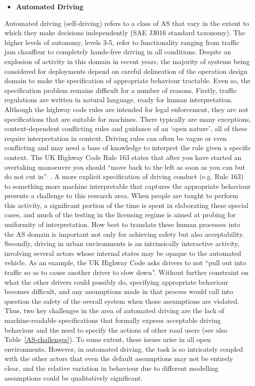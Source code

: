 \documentclass[sigconf,nonacm]{acmart}%
\begin{document}
	\begin{itemize}[leftmargin=0.5cm]
		\item \textbf{Automated Driving} 
	\end{itemize}
	Automated driving (self-driving) refers to a class of AS that vary in the extent to which they make decisions independently (SAE J3016 standard taxonomy). The higher levels of autonomy, levels 3-5, refer to functionality ranging from traffic jam chauffeur to completely hands-free driving in all conditions. Despite an explosion of activity in this domain in recent years, the majority of systems being considered for deployments depend on careful delineation of the operation design domain to make the specification of appropriate behaviour tractable. Even so, the specification problem remains difficult for a number of reasons. 
	Firstly, traffic regulations are written in natural language, ready for human interpretation. Although the highway code rules are intended for legal enforcement, they are not specifications that are suitable for machines. 
	There typically are many exceptions, context-dependent conflicting rules and guidance of an `open nature', all of these require interpretation in context. 
	Driving rules can often be vague or even conflicting and may need a base of knowledge to interpret the rule given a specific context. The UK Highway Code Rule 163 states that after you have started an overtaking manoeuvre you should ``move back to the left as soon as you can but do not cut in''~\cite{UKHighwayCode22}. A more explicit specification of driving conduct (e.g. Rule 163) to something more machine interpretable that captures the appropriate behaviour presents a challenge to this research area. When people are taught to perform this activity, a significant portion of the time is spent in elaborating these special cases, and much of the testing in the licensing regime is aimed at probing for uniformity of interpretation. How best to translate these human processes into the AS domain is important not only for achieving safety but also acceptability.
	Secondly, driving in urban environments is an intrinsically interactive activity, involving several actors whose internal states may be opaque to the automated vehicle. As an example, the UK Highway Code asks drivers to not ``pull out into traffic so as to cause another driver to slow down''. 
	Without further constraint on what the other drivers could possibly do, specifying appropriate behaviour becomes difficult, and any assumptions made in that process would call into question the safety of the overall system when those assumptions are violated. 
	Thus, two key challenges in the area of automated driving are the lack of machine-readable specifications that formally express acceptable driving behaviour and the need to specify the actions of other road users (see also Table~\ref{AS-challenges}). To some extent, these issues arise in all open environments. However, in automated driving, the task is so intricately coupled with the other actors that even the default assumptions may not be entirely clear, and the relative variation in behaviour due to different modelling assumptions could be qualitatively significant.
	
\end{document}
